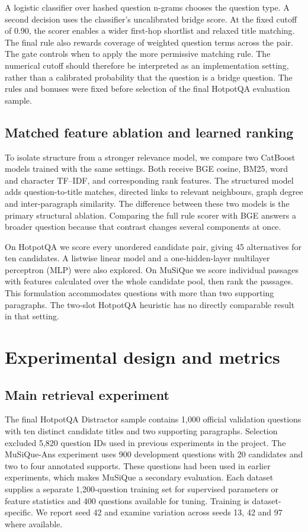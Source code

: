 \documentclass[twoside,a4paper,11pt]{article}
\begin{document}
A logistic classifier over hashed question n-grams chooses the question type. A second decision uses the classifier's uncalibrated bridge score. At the fixed cutoff of 0.90, the scorer enables a wider first-hop shortlist and relaxed title matching. The final rule also rewards coverage of weighted question terms across the pair. The gate controls when to apply the more permissive matching rule. The numerical cutoff should therefore be interpreted as an implementation setting, rather than a calibrated probability that the question is a bridge question. The rules and bonuses were fixed before selection of the final HotpotQA evaluation sample.

\subsection{Matched feature ablation and learned ranking}
To isolate structure from a stronger relevance model, we compare two CatBoost models trained with the same settings. Both receive BGE cosine, BM25, word and character TF--IDF, and corresponding rank features. The structured model adds question-to-title matches, directed links to relevant neighbours, graph degree and inter-paragraph similarity. The difference between these two models is the primary structural ablation. Comparing the full rule scorer with BGE answers a broader question because that contrast changes several components at once.

On HotpotQA we score every unordered candidate pair, giving 45 alternatives for ten candidates. A listwise linear model and a one-hidden-layer multilayer perceptron (MLP) were also explored. On MuSiQue we score individual passages with features calculated over the whole candidate pool, then rank the passages. This formulation accommodates questions with more than two supporting paragraphs. The two-slot HotpotQA heuristic has no directly comparable result in that setting.

\section{Experimental design and metrics}
\subsection{Main retrieval experiment}
The final HotpotQA Distractor sample contains 1,000 official validation questions with ten distinct candidate titles and two supporting paragraphs. Selection excluded 5,820 question IDs used in previous experiments in the project. The MuSiQue-Ans experiment uses 900 development questions with 20 candidates and two to four annotated supports. These questions had been used in earlier experiments, which makes MuSiQue a secondary evaluation. Each dataset supplies a separate 1,200-question training set for supervised parameters or feature statistics and 400 questions available for tuning. Training is dataset-specific. We report seed 42 and examine variation across seeds 13, 42 and 97 where available.
\end{document}
